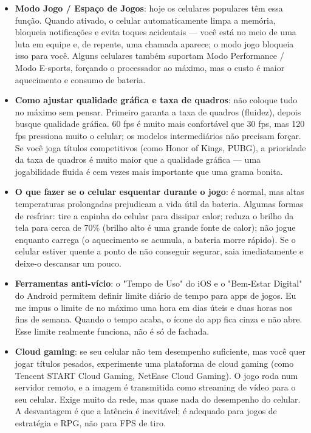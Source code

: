 \begin{itemize}
  \item \textbf{Modo Jogo / Espaço de Jogos}: hoje os celulares populares têm essa função. Quando ativado, o celular automaticamente limpa a memória, bloqueia notificações e evita toques acidentais — você está no meio de uma luta em equipe e, de repente, uma chamada aparece; o modo jogo bloqueia isso para você. Alguns celulares também suportam Modo Performance / Modo E-sports, forçando o processador ao máximo, mas o custo é maior aquecimento e consumo de bateria.
  \item \textbf{Como ajustar qualidade gráfica e taxa de quadros}: não coloque tudo no máximo sem pensar. Primeiro garanta a taxa de quadros (fluidez), depois busque qualidade gráfica. 60 fps é muito mais confortável que 30 fps, mas 120 fps pressiona muito o celular; os modelos intermediários não precisam forçar. Se você joga títulos competitivos (como Honor of Kings, PUBG), a prioridade da taxa de quadros é muito maior que a qualidade gráfica — uma jogabilidade fluida é cem vezes mais importante que uma grama bonita.
  \item \textbf{O que fazer se o celular esquentar durante o jogo}: é normal, mas altas temperaturas prolongadas prejudicam a vida útil da bateria. Algumas formas de resfriar: tire a capinha do celular para dissipar calor; reduza o brilho da tela para cerca de 70\% (brilho alto é uma grande fonte de calor); não jogue enquanto carrega (o aquecimento se acumula, a bateria morre rápido). Se o celular estiver quente a ponto de não conseguir segurar, saia imediatamente e deixe-o descansar um pouco.
  \item \textbf{Ferramentas anti-vício}: o "Tempo de Uso" do iOS e o "Bem-Estar Digital" do Android permitem definir limite diário de tempo para apps de jogos. Eu me impus o limite de no máximo uma hora em dias úteis e duas horas nos fins de semana. Quando o tempo acaba, o ícone do app fica cinza e não abre. Esse limite realmente funciona, não é só de fachada.
  \item \textbf{Cloud gaming}: se seu celular não tem desempenho suficiente, mas você quer jogar títulos pesados, experimente uma plataforma de cloud gaming (como Tencent START Cloud Gaming, NetEase Cloud Gaming). O jogo roda num servidor remoto, e a imagem é transmitida como streaming de vídeo para o seu celular. Exige muito da rede, mas quase nada do desempenho do celular. A desvantagem é que a latência é inevitável; é adequado para jogos de estratégia e RPG, não para FPS de tiro.
\end{itemize}

